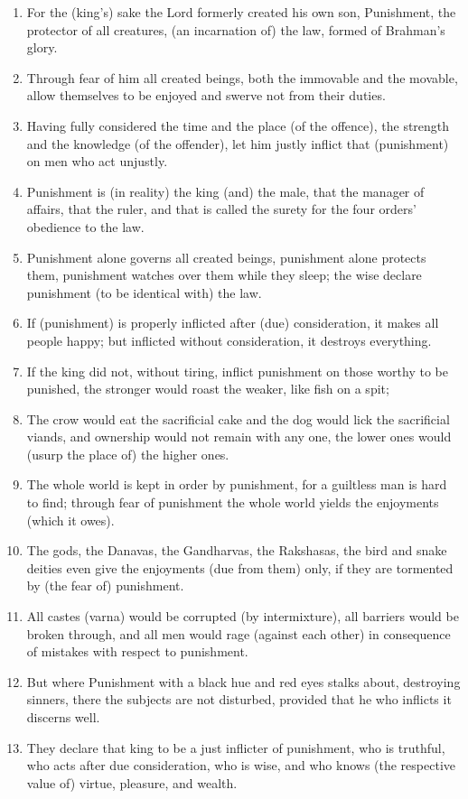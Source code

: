\begin{enumerate}
\item For the (king's) sake the Lord formerly created his own son, Punishment, the protector of all creatures, (an incarnation of) the law, formed of Brahman's glory.
\item Through fear of him all created beings, both the immovable and the movable, allow themselves to be enjoyed and swerve not from their duties.
\item Having fully considered the time and the place (of the offence), the strength and the knowledge (of the offender), let him justly inflict that (punishment) on men who act unjustly.
\item Punishment is (in reality) the king (and) the male, that the manager of affairs, that the ruler, and that is called the surety for the four orders' obedience to the law.
\item Punishment alone governs all created beings, punishment alone protects them, punishment watches over them while they sleep; the wise declare punishment (to be identical with) the law.
\item If (punishment) is properly inflicted after (due) consideration, it makes all people happy; but inflicted without consideration, it destroys everything.
\item If the king did not, without tiring, inflict punishment on those worthy to be punished, the stronger would roast the weaker, like fish on a spit;
\item The crow would eat the sacrificial cake and the dog would lick the sacrificial viands, and ownership would not remain with any one, the lower ones would (usurp the place of) the higher ones.
\item The whole world is kept in order by punishment, for a guiltless man is hard to find; through fear of punishment the whole world yields the enjoyments (which it owes).
\item The gods, the Danavas, the Gandharvas, the Rakshasas, the bird and snake deities even give the enjoyments (due from them) only, if they are tormented by (the fear of) punishment.
\item All castes (varna) would be corrupted (by intermixture), all barriers would be broken through, and all men would rage (against each other) in consequence of mistakes with respect to punishment.
\item But where Punishment with a black hue and red eyes stalks about, destroying sinners, there the subjects are not disturbed, provided that he who inflicts it discerns well.
\item They declare that king to be a just inflicter of punishment, who is truthful, who acts after due consideration, who is wise, and who knows (the respective value of) virtue, pleasure, and wealth.

\end{enumerate}
